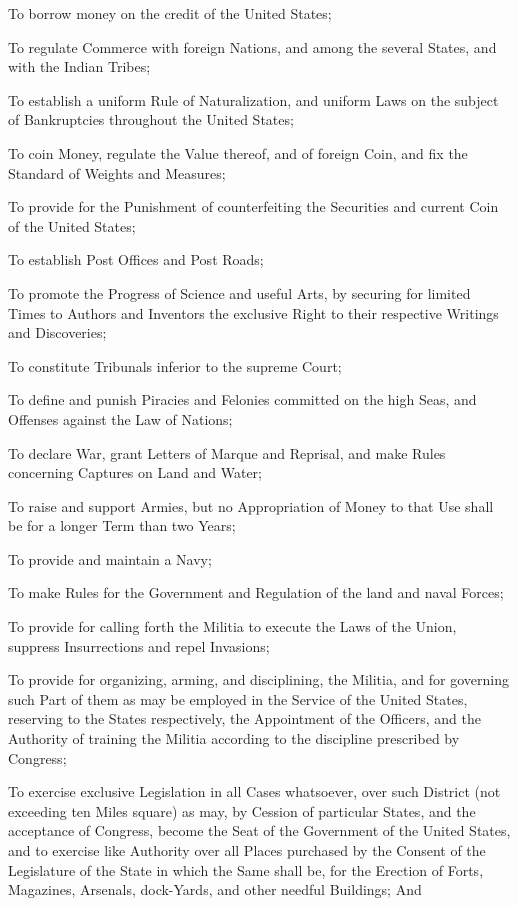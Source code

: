 \documentclass{constitution}
\begin{document}
To borrow money on the credit of the United States;

To regulate Commerce with foreign Nations, and among the several States, and with the Indian Tribes;

To establish a uniform Rule of Naturalization,
and uniform Laws on the subject of Bankruptcies throughout the United States;

To coin Money, regulate the Value thereof, and of foreign Coin,
and fix the Standard of Weights and Measures;

To provide for the Punishment of counterfeiting the Securities and current Coin of the United States;

To establish Post Offices and Post Roads;

To promote the Progress of Science and useful Arts,
by securing for limited Times to Authors and Inventors the exclusive Right to their respective Writings and Discoveries;

To constitute Tribunals inferior to the supreme Court;

To define and punish Piracies and Felonies committed on the high Seas,
and Offenses against the Law of Nations;

To declare War, grant Letters of Marque and Reprisal,
and make Rules concerning Captures on Land and Water;

To raise and support Armies,
but no Appropriation of Money to that Use shall be for a longer Term than two Years;

To provide and maintain a Navy;

To make Rules for the Government and Regulation of the land and naval Forces;

To provide for calling forth the Militia to execute the Laws of the Union, suppress Insurrections and repel Invasions;

To provide for organizing, arming, and disciplining, the Militia,
and for governing such Part of them as may be employed in the Service of the United States,
reserving to the States respectively, the Appointment of the Officers, and the Authority of training the Militia according to the discipline prescribed by Congress;

To exercise exclusive Legislation in all Cases whatsoever, over such District (not exceeding ten Miles square) as may,
by Cession of particular States, and the acceptance of Congress,
become the Seat of the Government of the United States,
and to exercise like Authority over all Places purchased by the Consent of the Legislature of the State in which the Same shall be, for the Erection of Forts, Magazines, Arsenals, dock-Yards, and other needful Buildings; And
\end{document}
